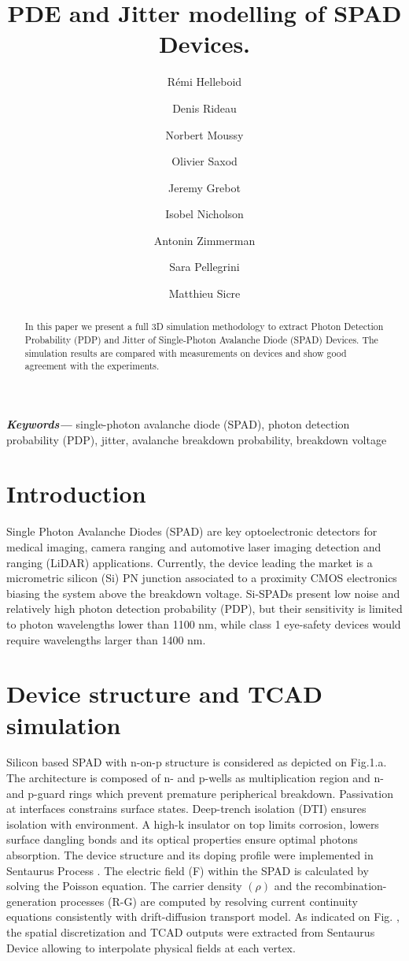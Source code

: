\documentclass[10pt,a4paper,twocolumn]{article}
\title{PDE and Jitter modelling of SPAD Devices.}
\author[1]{Rémi Helleboid}
\author[1]{Denis Rideau}
\author[3]{Norbert Moussy}
\author[3]{Olivier Saxod}
\author[1]{Jeremy Grebot}
\author[2]{Isobel Nicholson}
\author[1]{Antonin Zimmerman}
\author[2]{Sara Pellegrini}
\author[1]{Matthieu Sicre}
\affil[1]{ST Microelectronics, Crolles, France}
\affil[2]{ST Microelectronics, Edinburgh, UK}
\affil[3]{CEA LETI, Grenoble, France}
\date{}                     %
\providecommand{\keywords}[1]
{
  \small	
  \textbf{\textit{Keywords---}} #1
}
\begin{document}
\maketitle

\begin{abstract}
In this paper we present a full 3D simulation methodology to extract Photon Detection Probability (PDP) and Jitter of Single-Photon Avalanche Diode (SPAD) Devices. The simulation results are compared with measurements on devices and show good agreement with the experiments.\\
\end{abstract}

\keywords{single-photon avalanche diode (SPAD), photon detection probability (PDP), jitter, avalanche breakdown probability, breakdown voltage}

\section{Introduction}
Single Photon Avalanche Diodes (SPAD) are key optoelectronic detectors for medical imaging, camera ranging and automotive laser imaging detection and ranging (LiDAR) applications. Currently, the device leading the market is a micrometric silicon (Si) PN junction associated to a proximity CMOS electronics biasing the system above the breakdown voltage. Si-SPADs present low noise and relatively high photon detection probability (PDP), but their sensitivity is limited to photon wavelengths lower than 1100 nm, while class 1 eye-safety devices would require wavelengths larger than 1400 nm.


\section{Device structure and TCAD simulation}
Silicon based SPAD with n-on-p structure is considered as depicted on Fig.1.a. The architecture is composed of n- and p-wells as multiplication region and n- and p-guard rings which prevent premature peripherical breakdown. Passivation at interfaces constrains surface states. Deep-trench isolation (DTI) ensures isolation with environment. A high-k insulator on top limits corrosion, lowers surface dangling bonds and its optical properties ensure optimal photons absorption. The device structure and its doping profile were implemented in Sentaurus Process . The electric field (F) within the SPAD is calculated by solving the Poisson equation. The carrier density $(\rho)$ and the recombination-generation processes (R-G) are computed by resolving current continuity equations consistently with drift-diffusion transport model. As indicated on Fig. , the spatial discretization and TCAD outputs were extracted from Sentaurus Device  allowing to interpolate physical fields at each vertex.
\end{document}

